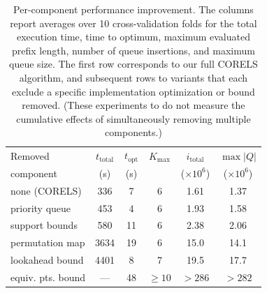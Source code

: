 \begin{table}[t]
\centering
\begin{tabular}{l | c | c | c | c | c}
Removed & $t_\text{total}$ & $t_\text{opt}$ & $K_\text{max}$ & $i_\text{total}$ & $\max | Q |$ \\
component & (s) & (s) & & ($\times 10^6$) & ($\times 10^6$) \\
\hline
none (CORELS) & 336 & 7 & 6 & 1.61 & 1.37 \\
priority queue & 453 & 4 & 6 & 1.93 & 1.58 \\
support bounds & 580 & 11 & 6 & 2.38 & 2.06 \\
permutation map & 3634 & 19 & 6 & 15.0 & 14.1 \\
lookahead bound & 4401 & 8 & 7 & 19.5 & 17.7 \\
equiv. pts. bound & --- & 48 & $\ge 10$ & $>286$ & $>282$ \\
\end{tabular}
\vspace{5mm}
\caption{Per-component performance improvement.
The columns report averages over 10 cross-validation folds for
the total execution time, time to optimum, maximum evaluated prefix length,
number of queue insertions, and maximum queue size.
The first row corresponds to our full CORELS algorithm,
and subsequent rows to variants that each exclude a specific
implementation optimization or bound removed.
(These experiments to do not measure the cumulative effects
of simultaneously removing multiple components.)
}
\label{tab:ablation}
\end{table}


